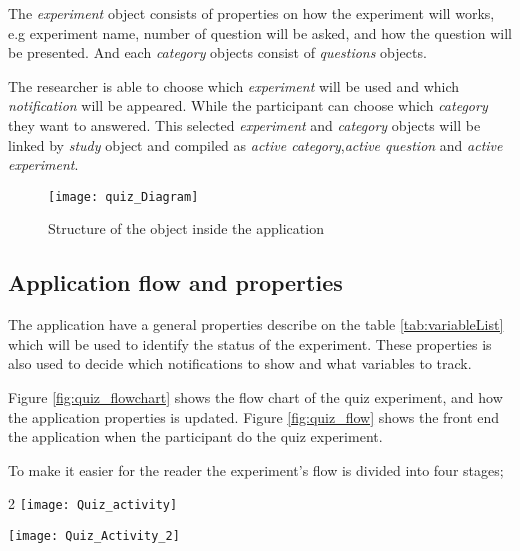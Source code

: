 The \textit{experiment} object consists of properties on how the experiment will works, e.g experiment name, number of question will be asked, and how the question will be presented.
And each \textit{category} objects consist of \textit{questions} objects.

The researcher is able to choose which \textit{experiment} will be used and which \textit{notification} will be appeared.
While the participant can choose which \textit{category} they want to answered.
This selected \textit{experiment} and \textit{category} objects will be linked by
\textit{study} object and compiled as \textit{active category},\textit{active question} and \textit{active experiment}.

\begin{figure}[!b]
\begin{center}
\texttt{[image: quiz\_Diagram]}
\end{center}
\centering
\captionsetup{justification=centering}
\caption{Structure of the object inside the application}
\label{fig:Experiment_objects}
\end{figure}


\subsection{Application flow and properties}

The application have a general properties describe on the table \ref{tab:variableList} which will be used to identify the status of the experiment.
These properties is also used to decide which notifications to show and what variables to track.

Figure \ref{fig:quiz_flowchart} shows the flow chart of the quiz experiment, and how the application properties is updated.
Figure \ref{fig:quiz_flow} shows the front end the application when the participant do the quiz experiment.

To make it easier for the reader the experiment's flow is divided into four stages;
\begin{figure*}[!b]
\begin{multicols}{2}
    \texttt{[image: Quiz\_activity]}\par
    \texttt{[image: Quiz\_Activity\_2]}\par
    \end{multicols}
\centering
\captionsetup{justification=centering}
\caption{Quiz flowchart}
\label{fig:quiz_flowchart}
\end{figure*}


